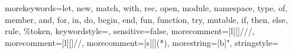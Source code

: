 \def\dunderline#1{\underline{\underline{#1}}}
\def\indent{\space\space\space\space}
\def\vb#1{\text{\Verb?#1?}}



  {morekeywords={let, new, match, with, rec, open, module, namespace, type, of, member, and, for, in, do, begin, end, fun, function, try, mutable, if, then, else, rule, \%token},
    keywordstyle=\color{bluekeywords},
    sensitive=false,
    morecomment=[l][\color{greencomments}]{///},
    morecomment=[l][\color{greencomments}]{//},
    morecomment=[s][\color{greencomments}]{{(*)}},
    morestring=[b]",
    stringstyle=\color{redstrings}
    }

\lstset{language=fsharp}

